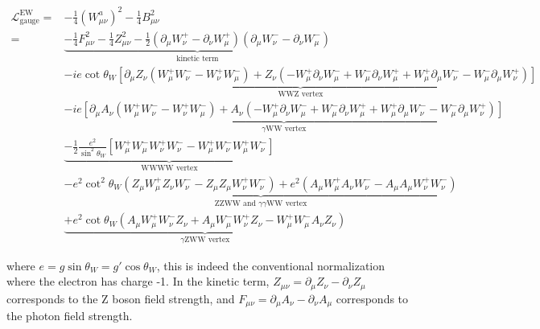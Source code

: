 \begin{small}
\begin{equation}\label{eq:lag_ew_gauge}
\begin{aligned}
    \mathcal{L}_{\text{gauge}}^{\text{EW}} =& -\frac{1}{4}(W_{\mu\nu}^a)^2-\frac{1}{4}B_{\mu\nu}^2\\
    =& \underbrace{-\frac{1}{4}F^2_{\mu\nu}-\frac{1}{4}Z^2_{\mu\nu}
    -\frac{1}{2}(\partial_{\mu}W^+_{\nu}-\partial_{\nu}W^+_{\mu})
    (\partial_{\mu}W^-_{\nu}-\partial_{\nu}W^-_{\mu})}_{\text{kinetic term}}\\
    &\underbrace{-ie\cot{\theta_W}\left[
    \partial_{\mu}Z_{\nu}(W^+_{\mu}W^-_{\nu}-W^+_{\nu}W^-_{\mu})+
    Z_{\nu}(-W^+_{\mu}\partial_{\nu}W^-_{\mu}+W^-_{\mu}\partial_{\nu}W^+_{\mu}+W^+_{\mu}\partial_{\mu}W^-_{\nu}-W^-_{\mu}\partial_{\mu}W^+_{\nu})
    \right]}_{\text{WWZ vertex}}\\
    &\underbrace{-ie\left[
    \partial_{\mu}A_{\nu}(W^+_{\mu}W^-_{\nu}-W^+_{\nu}W^-_{\mu})+
    A_{\nu}(-W^+_{\mu}\partial_{\nu}W^-_{\mu}+W^-_{\mu}\partial_{\nu}W^+_{\mu}+W^+_{\mu}\partial_{\mu}W^-_{\nu}-W^-_{\mu}\partial_{\mu}W^+_{\nu})
    \right]}_{\gamma\text{WW vertex}}\\
    &\underbrace{-\frac{1}{2}\frac{e^2}{\sin^2{\theta_W}}
    \left[
    W^+_{\mu}W^-_{\mu}W^+_{\nu}W^-_{\nu}-W^+_{\mu}W^-_{\nu}W^+_{\mu}W^-_{\nu}
    \right]}_{\text{WWWW vertex}}\\
    &\underbrace{-e^2\cot^2{\theta_W}(Z_{\mu}W^+_{\mu}Z_{\nu}W^-_{\nu} - Z_{\mu}Z_{\mu}W^+_{\nu}W^-_{\nu})
    +e^2(A_{\mu}W^+_{\mu}A_{\nu}W^-_{\nu} - A_{\mu}A_{\mu}W^+_{\nu}W^-_{\nu})}_{\text{ZZWW and }\gamma\gamma\text{WW vertex}}\\
    &\underbrace{+e^2\cot{\theta_W}(A_{\mu}W^+_{\mu}W^-_{\nu}Z_{\nu} + A_{\mu}W^-_{\mu}W^+_{\nu}Z_{\nu} - W^+_{\mu}W^-_{\mu}A_{\nu}Z_{\nu})}_{\gamma\text{ZWW vertex}}
\end{aligned}
\end{equation}
\end{small}
where $e = g\sin{\theta_W} = g'\cos{\theta_W}$, this is indeed the conventional normalization where the electron has charge -1.
In the kinetic term, $Z_{\mu\nu}=\partial_\mu Z_\nu - \partial_\nu Z_\mu$
corresponds to the $\text{Z}$ boson field strength, and $F_{\mu\nu}=\partial_\mu A_\nu - \partial_\nu A_\mu$ corresponds to the photon field strength.

